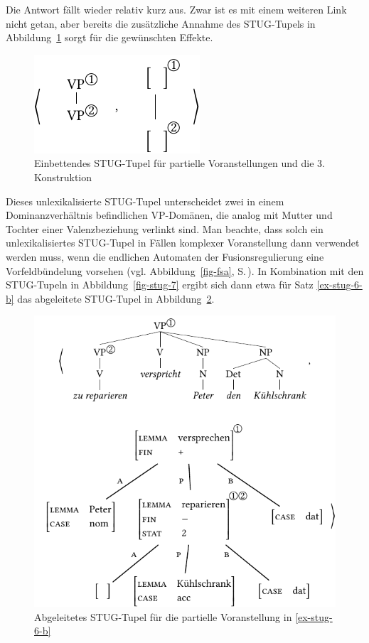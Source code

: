 Die Antwort fällt wieder relativ kurz aus. Zwar ist es mit einem weiteren Link nicht getan, aber bereits die zusätzliche Annahme des STUG-Tupels in Abbildung~\ref{fig-stug-9} sorgt für die gewünschten Effekte.
\begin{figure}[t]
\centering
\includegraphics{graphics/abb911.pdf}
\caption{\label{fig-stug-9}Einbettendes STUG-Tupel für partielle Voranstellungen und die 3. Konstruktion}
\end{figure}
Dieses unlexikalisierte STUG-Tupel unterscheidet zwei in einem Dominanzverhältnis befindlichen VP-Domänen, die analog mit Mutter und Tochter einer Valenzbeziehung verlinkt sind. Man beachte, dass solch ein unlexikalisiertes STUG-Tupel in Fällen komplexer Voranstellung dann verwendet werden muss, wenn die endlichen Automaten der Fusionsregulierung eine Vorfeldbündelung vorsehen (vgl. Abbildung~\ref{fig-fsa}, S.\,\pageref{fig-fsa}). In Kombination mit den STUG-Tupeln in Abbildung~\ref{fig-stug-7} ergibt sich dann etwa für Satz \ref{ex-stug-6-b} das abgeleitete STUG-Tupel in Abbildung~\ref{fig-stug-10}.
\begin{figure}[t]
\centering
\includegraphics{graphics/abb912.pdf}
\caption{\label{fig-stug-10} Abgeleitetes STUG-Tupel für die partielle Voranstellung in \ref{ex-stug-6-b}}
\end{figure}
